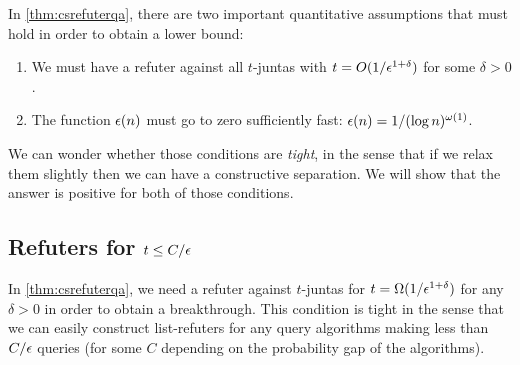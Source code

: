 In \cref{thm:csrefuterqa}, there are two important quantitative assumptions
that must hold in order to obtain a lower bound:

\begin{enumerate}
    \item We must have a refuter against all $t$-juntas with $t = O(1 / \epsilon^{1+\delta})$ for
    some $\delta > 0$.
    \item The function $\epsilon(n)$ must go to zero sufficiently fast: $\epsilon(n) = 1/(\log n)^{\omega(1)}$.
\end{enumerate}

We can wonder whether those conditions are \emph{tight}, in the sense that if we relax them slightly 
then we can have a constructive separation. We will show that the answer is positive for both of
those conditions. 

\subsection{Refuters for $t \leq C/\epsilon$}

In \cref{thm:csrefuterqa}, we need a refuter against $t$-juntas for $t = \Omega(1/\epsilon^{1+\delta})$ for any $\delta > 0$ in order 
to obtain a breakthrough. This condition is tight in the sense that we can easily construct list-refuters
for any query algorithms making less than
$C/\epsilon$ queries (for some $C$ depending on the probability gap of the algorithms).

